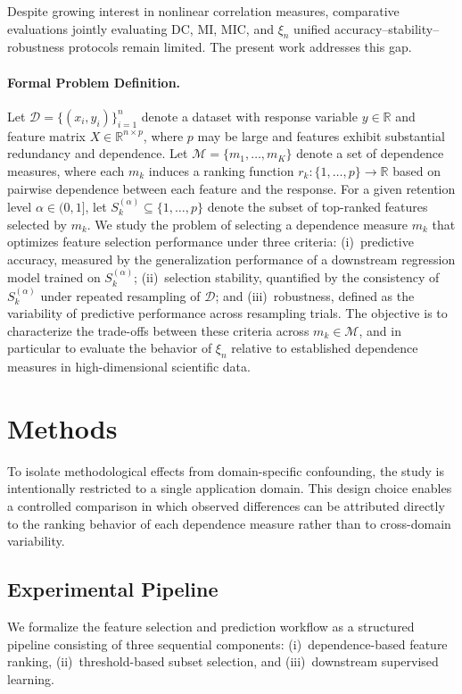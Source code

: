 \documentclass[twoside,11pt]{article}
\begin{document}
Despite growing interest in nonlinear correlation measures, comparative evaluations jointly evaluating DC, MI, MIC, and $\xi_n$ unified accuracy--stability--robustness protocols remain limited. The present work addresses this gap.

\paragraph{Formal Problem Definition.}
Let $\mathcal{D} = \{(x_i, y_i)\}_{i=1}^n$ denote a dataset with response
variable $y \in \mathbb{R}$ and feature matrix $X \in \mathbb{R}^{n \times p}$,
where $p$ may be large and features exhibit substantial redundancy and
dependence. Let $\mathcal{M} = \{m_1, \dots, m_K\}$ denote a set of dependence
measures, where each $m_k$ induces a ranking function
$r_k : \{1, \dots, p\} \to \mathbb{R}$ based on pairwise dependence between
each feature and the response. For a given retention level $\alpha \in (0,1]$,
let $S_k^{(\alpha)} \subseteq \{1, \dots, p\}$ denote the subset of top-ranked
features selected by $m_k$. We study the problem of selecting a dependence
measure $m_k$ that optimizes feature selection performance under three criteria:
(i)~predictive accuracy, measured by the generalization performance of a
downstream regression model trained on $S_k^{(\alpha)}$;
(ii)~selection stability, quantified by the consistency of $S_k^{(\alpha)}$
under repeated resampling of $\mathcal{D}$; and
(iii)~robustness, defined as the variability of predictive performance across
resampling trials. The objective is to characterize the trade-offs between these
criteria across $m_k \in \mathcal{M}$, and in particular to evaluate the
behavior of $\xi_n$ \citep{Chatterjee2021} relative to established dependence
measures in high-dimensional scientific data.

\section{Methods}
To isolate methodological effects from domain-specific confounding, the study
is intentionally restricted to a single application domain. This design choice
enables a controlled comparison in which observed differences can be attributed
directly to the ranking behavior of each dependence measure rather than to
cross-domain variability.

\subsection{Experimental Pipeline}
We formalize the feature selection and prediction workflow as a structured
pipeline consisting of three sequential components: (i)~dependence-based feature
ranking, (ii)~threshold-based subset selection, and (iii)~downstream supervised
learning.
\end{document}
